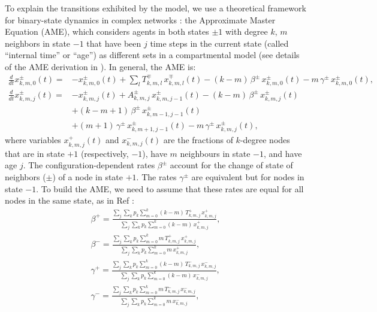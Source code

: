 	To explain the transitions exhibited by the model, we use a theoretical framework for binary-state dynamics in complex networks \cite{gleeson-2013}: the Approximate Master Equation (AME), which considers agents in both states $\pm 1$ with degree $k$, $m$ neighbors in state $-1$ that have been $j$ time steps in the current state (called ``internal time'' or ``age'') as different sets in a compartmental model (see details of the AME derivation in \cite{Abella-2022-AME,gleeson-2013}). In general, the AME is:
	\begin{eqnarray}
		\label{eq:AME_age}
		\frac{d}{d t} x^{\pm}_{k, m, 0}(t)=&- x^{\pm}_{k, m, 0}(t) + \sum_l T^{\mp}_{k, m,l} \, x^{\mp}_{k, m, l}(t) - (k-m) \,\beta^{\pm} \, x^{\pm}_{k, m, 0}(t) - m \,\gamma^{\pm} \, x^{\pm}_{k, m, 0}(t), 
		\nonumber\\
		\frac{d}{d t} x^{\pm}_{k, m, j}(t)=&- x^{\pm}_{k, m, j}(t)+ A^{\pm}_{k, m,j} \, x^{\pm}_{k, m, j-1}(t) - (k-m) \,\beta^{\pm} \, x^{\pm}_{k, m, j}(t)\\
		&+ (k-m+1) \,\beta^{\pm} \, x^{\pm}_{k, m-1, j-1}(t)\nonumber\\
		&+ (m+1) \,\gamma^{\pm} \, x^{\pm}_{k,m+1,j-1}(t) - m \,\gamma^{\pm} \, x^{\pm}_{k, m, j}(t), \nonumber
	\end{eqnarray}
	where variables $x^{+}_{k,m,j}(t)$ and $x^{-}_{k,m,j}(t)$ are the fractions of $k$-degree nodes that are in state $+1$ (respectively, $-1$), have $m$ neighbours in state $-1$, and have age $j$. The configuration-dependent rates $\beta^{\pm}$ account for the change of state of neighbors ($\pm$) of a node in state $+1$. The rates $\gamma^{\pm}$ are equivalent but for nodes in state $-1$. To build the AME, we need to assume that these rates are equal for all nodes in the same state, as in Ref \cite{gleeson-2013}:
	\begin{eqnarray}
		\beta^{+} = \frac{\sum_j \sum_k p_k \sum_{m = 0}^{k} (k - m) \, T^{+}_{k,m,j} \, x^{+}_{k,m,j}}{\sum_j \sum_k p_k \sum_{m = 0}^{k} (k - m) \, x^{+}_{k,m,j}}, \nonumber\\
		\beta^{-} = \frac{\sum_j \sum_k p_k \sum_{m = 0}^{k} m \, T^{+}_{k,m,j} \, x^{+}_{k,m,j}}{\sum_j \sum_k p_k \sum_{m = 0}^{k} m \, x^{+}_{k,m,j}},\nonumber\\
		\gamma^{+} = \frac{\sum_j \sum_k p_k \sum_{m = 0}^{k} (k - m) \, T^{-}_{k,m,j} \, x^{-}_{k,m,j}}{\sum_j \sum_k p_k \sum_{m = 0}^{k} (k - m) \, x^{-}_{k,m,j}},\\
		\gamma^{-} = \frac{\sum_j \sum_k p_k \sum_{m = 0}^{k} m \, T^{-}_{k,m,j} \, x^{-}_{k,m,j}}{\sum_j \sum_k p_k \sum_{m = 0}^{k} m \, x^{-}_{k,m,j}},\nonumber
	\end{eqnarray}
